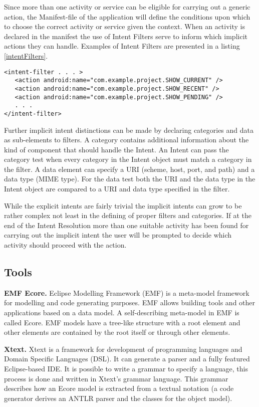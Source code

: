 Since more than one activity or service can be eligible for carrying out a generic action, the Manifest-file of the application will define the conditions upon which to choose the correct activity or service given the context. When an activity is declared in the manifest the use of Intent Filters serve to inform which implicit actions they can handle. Examples of Intent Filters are presented in a listing \ref{intentFilters}.

{\footnotesize\begin{lstlisting}[label=intentFilters,caption=Intent Filters]
<intent-filter . . . >
   <action android:name="com.example.project.SHOW_CURRENT" />
   <action android:name="com.example.project.SHOW_RECENT" />
   <action android:name="com.example.project.SHOW_PENDING" />
   . . .
</intent-filter>
\end{lstlisting}}

Further implicit intent distinctions can be made by declaring categories and data as sub-elements to filters. A category contains additional information about the kind of component that should handle the Intent. An Intent can pass the category test when every category in the Intent object must match a category in the filter. A data element can specify a URI (scheme, host, port, and path) and a data type (MIME type). For the data test both the URI and the data type in the Intent object are compared to a URI and data type specified in the filter. 

While the explicit intents are fairly trivial the implicit intents can grow to be rather complex not least in the defining of proper filters and categories. If at the end of the Intent Resolution more than one suitable activity has been found for carrying out the implicit intent the user will be prompted to decide which activity should proceed with the action. 


\subsection{Tools}
\label{tools}
\textbf{EMF Ecore.} Eclipse Modelling Framework (EMF) \cite{emf} is a meta-model framework for modelling and code generating purposes. EMF allows building tools and other applications based on a data model. A self-describing meta-model in EMF is called Ecore. EMF models have a tree-like structure with a root element and other elements are contained by the root itself or through other elements. 

\textbf{Xtext.} Xtext \cite{xtext} is a framework for development of programming languages and Domain Specific Languages (DSL). It can generate a parser and a fully featured Eclipse-based IDE. It is possible to write a grammar to specify a language, this process is done and written in Xtext's grammar language. This grammar describes how an Ecore model is extracted from a textual notation (a code generator derives an ANTLR parser and the classes for the object model).

